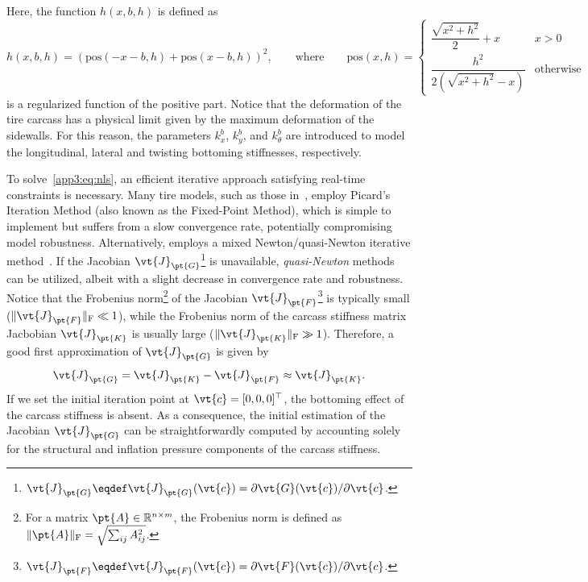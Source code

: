 %
Here, the function $h(x,b,h)$ is defined as
%
\begin{equation}
  h(x,b,h) = \left(\mathrm{pos}(-x-b, h) + \mathrm{pos}(x-b, h)\right)^2,
  \qquad \text{where} \qquad
  \mathrm{pos}(x,h) =
  \begin{cases}
    \dfrac{\sqrt{x^2 + h^2}}{2}+x    & x>0 \\[0.5em]
    \dfrac{h^2}{2(\sqrt{x^2+h^2}-x)} & \mathrm{otherwise}
  \end{cases}
\end{equation}
%
is a regularized function of the positive part. Notice that the deformation of the tire carcass has a physical limit given by the maximum deformation of the sidewalls. For this reason, the parameters $k_x^b$, $k_y^b$, and $k_\theta^b$ are introduced to model the longitudinal, lateral and twisting bottoming stiffnesses, respectively.

To solve~\eqref{app3:eq:nls}, an efficient iterative approach satisfying real-time constraints is necessary. Many tire models, such as those in~\cite{gruber2012normalI, gruber2012normalII, miyashita2010tire, miyashita2003analytical, miyashita2006new, kabe2006new, miyashita2015study}, employ Picard's Iteration Method (also known as the Fixed-Point Method), which is simple to implement but suffers from a slow convergence rate, potentially compromising model robustness. Alternatively, \TaMeTire{} employs a mixed Newton/quasi-Newton iterative method~\cite{fevrier2013method}. If the Jacobian $\vt{J}_\pt{G}$\footnote{$\vt{J}_\pt{G} \eqdef \vt{J}_\pt{G}(\vt{c}) = \partial\vt{G}(\vt{c})/\partial\vt{c}$.} is unavailable, \emph{quasi-Newton} methods can be utilized, albeit with a slight decrease in convergence rate and robustness. Notice that the Frobenius norm\footnote{For a matrix $\pt{A}\in\mathbb{R}^{n \times m}$, the Frobenius norm is defined as $\|\pt{A}\|_\mathrm{F}=\sqrt{\sum_{ij}A_{ij}^2}$.} of the Jacobian $\vt{J}_\pt{F}$\footnote{$\vt{J}_\pt{F} \eqdef \vt{J}_\pt{F}(\vt{c}) = \partial\vt{F}(\vt{c})/\partial\vt{c}$.} is typically small ($\|\vt{J}_\pt{F}\|_\mathrm{F} \ll 1$), while the Frobenius norm of the carcass stiffness matrix Jacbobian $\vt{J}_\pt{K}$ is usually large ($\|\vt{J}_\pt{K}\|_\mathrm{F} \gg 1$). Therefore, a good first approximation of $\vt{J}_\pt{G}$ is given by
%
\begin{equation}
  \vt{J}_\pt{G} = \vt{J}_\pt{K} - \vt{J}_\pt{F} \approx \vt{J}_\pt{K}.
  \label{app3:eq:jacobian_approx}
\end{equation}
%
If we set the initial iteration point at $\vt{c} = [0,0,0]^\top$, the bottoming effect of the carcass stiffness is absent. As a consequence, the initial estimation of the Jacobian $\vt{J}_\pt{G}$ can be straightforwardly computed by accounting solely for the structural and inflation pressure components of the carcass stiffness.

